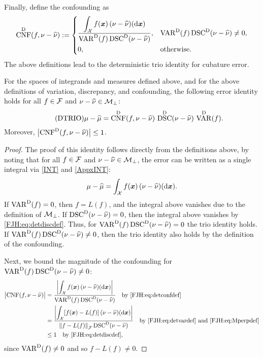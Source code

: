 \documentclass[graybox,footinfo]{svmult}
\DeclareMathOperator{\algn}{CNF}
\DeclareMathOperator{\disc}{DSC}
\DeclareMathOperator{\Var}{VAR}
\begin{document}
Finally, define the confounding as 
	\begin{equation} \label{FJH:eq:detconfdef}
\algn^\Dt(f,\nu - \hnu): =  \begin{cases} \displaystyle 
\frac{\displaystyle\int_{\cx} f(\bsx) \, (\nu - \hnu)(\D 
	\bsx)}{\Var^\Dt(f)\disc^\Dt(\nu - \hnu)},  & 
\Var^\Dt(f)\disc^\Dt(\nu - \hnu) \ne 0, \\[2ex]
0, & \text{otherwise}.
\end{cases}
\end{equation}
The above definitions lead to the deterministic trio identity for cubature 
error.

\begin{theorem}  \label{FJH:thm:dtrio} For the spaces 
of integrands and 
measures defined above, and for the above definitions of variation, discrepancy, and 
confounding, the following error identity holds for all $f \in \mathcal{F}$ and $\nu - \widehat{\nu}  \in 
\mathcal{M}_\bot$: 
\begin{equation} \tag{DTRIO} \label{FJH:eq:dtrio}
\mu - \hmu  = \algn^\Dt(f,\nu - \hnu) \, \disc^\Dt(\nu - \hnu) \, \Var^{\Dt}(f).
\end{equation}
Moreover, $\abs{\algn^\Dt(f,\nu - \hnu)} \le 1$. 
\end{theorem}
\begin{proof}  The proof of this identity follows directly from the definitions above, by 
noting that for all $f \in \mathcal{F}$ and $\nu - \widehat{\nu}  \in \mathcal{M}_\bot$, the error can be written as a 
single integral via \eqref{INT} and \eqref{AppxINT}:
	\begin{equation} \label{FJH:eq:err_as_int}
	\mu - \hmu   =  \int_{\cx} f(\bsx) \, (\nu - \hnu)(\D \bsx).
	\end{equation}
	If $\Var^{\Dt}(f) = 0$, then $f = L(f)$, and the integral above vanishes due to the 
	definition of $\mathcal{M}_{\bot}$.  If $\disc^\Dt(\nu - \hnu) = 0$, then the integral above 
	vanishes by \eqref{FJH:eq:detdiscdef}.  Thus, for $\Var^{\Dt}(f) \disc^\Dt(\nu - \hnu) = 
	0$ 
	the trio identity holds. If $\Var^{\Dt}(f) \disc^\Dt(\nu - \hnu) \ne 0$, then the trio 
	identity also holds by the definition of the confounding.
	
	Next, we bound the magnitude of the confounding for $\Var^{\Dt}(f) \disc^\Dt(\nu - 
	\hnu) \ne 0$: 
	\begin{align*}
	\abs{\algn(f,\nu - \hnu)} & = 
		\frac{\biggl \lvert\displaystyle\int_{\cx} f(\bsx) \, (\nu - \hnu)(\D 
			\bsx) \biggr \rvert}{\Var^\Dt(f)\disc^\Dt(\nu - \hnu)} \quad \text{by 
			\eqref{FJH:eq:detconfdef}}\\
		& = \frac{\biggl \lvert\displaystyle\int_{\cx} [f(\bsx) - L(f)] \, (\nu - \hnu)(\D 
			\bsx) \biggr \rvert}{\norm{f-L(f)}_{\cf}\disc^\Dt(\nu - \hnu)} \quad \text{by 
			\eqref{FJH:eq:detvardef} and \eqref{FJH:eq:Mperpdef}} \\
		& \le 1 \quad \text{by \eqref{FJH:eq:detdiscdef}},
\end{align*}
since $\Var^{\Dt}(f) \ne 0$ and so $f - L(f) \ne 0$.
\end{proof}
\end{document}

